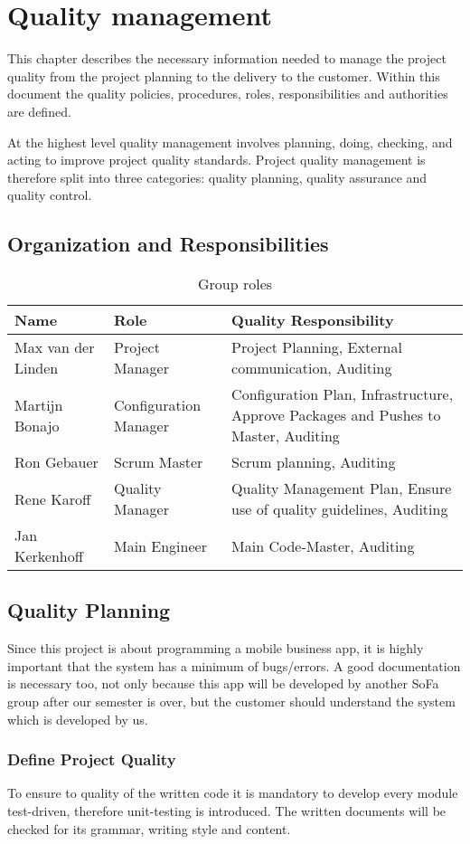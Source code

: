 \section{Quality management}
This chapter describes the necessary information needed to manage the project quality from the project planning to the delivery
to the customer. Within this document the quality policies, procedures, roles, responsibilities and authorities are defined.

At the highest level quality management involves planning, doing, checking, and acting to improve project quality standards. Project quality management is therefore split into three categories: quality planning, quality assurance and quality control.
\subsection{Organization and Responsibilities}
\begin{table}[htbp]
	\begin{tabular}{ p{4cm} p{} p{} }
		\textbf{Name} & \textbf{Role} & \textbf{Quality Responsibility} \\ \hline
		Max van der Linden & Project Manager & Project Planning, External communication, Auditing \\ 
		Martijn Bonajo & Configuration Manager & Configuration Plan, Infrastructure, Approve Packages and Pushes to Master, Auditing \\ 
		Ron Gebauer & Scrum Master & Scrum planning, Auditing \\ 
		Rene Karoff & Quality Manager & Quality Management Plan, Ensure use of quality guidelines, Auditing \\ 
		Jan Kerkenhoff & Main Engineer & Main Code-Master, Auditing \\
	\end{tabular}
	\caption{Group roles\label{tab:GroupRoles}}
\end{table}
\subsection{Quality Planning}
Since this project is about programming a mobile business \gls{app}, it is highly important that the system has a minimum of bugs/errors. A good documentation is necessary too, not only because this \gls{app} will be developed by another SoFa group after our semester is over, but the customer should understand the system which is developed by us.
\subsubsection{Define Project Quality}
To ensure to quality of the written code it is mandatory to develop every module test-driven, therefore unit-testing is introduced. The written documents will be checked for its grammar, writing style and content.
